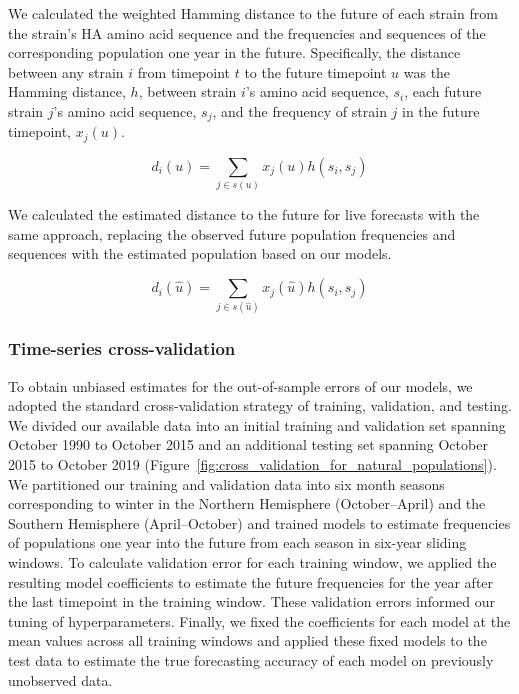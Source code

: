 We calculated the weighted Hamming distance to the future of each strain from the strain's HA amino acid sequence and the frequencies and sequences of the corresponding population one year in the future.
Specifically, the distance between any strain $i$ from timepoint $t$ to the future timepoint $u$ was the Hamming distance, $h$, between strain $i$'s amino acid sequence, $s_{i}$, each future strain $j$'s amino acid sequence, $s_{j}$, and the frequency of strain $j$ in the future timepoint, $x_{j}(u)$.

\begin{equation}
  d_{i}(u) = \sum_{j \in s(u)}{x_{j}(u)h(s_{i}, s_{j})}
  \label{equation_observed_weighted_distance_to_future}
\end{equation}

We calculated the estimated distance to the future for live forecasts with the same approach, replacing the observed future population frequencies and sequences with the estimated population based on our models.

\begin{equation}
  d_{i}(\hat{u}) = \sum_{j \in s(\hat{u})}{x_{j}(\hat{u})h(s_{i}, s_{j})}
  \label{equation_estimated_weighted_distance_to_future}
\end{equation}

\subsubsection*{Time-series cross-validation}

To obtain unbiased estimates for the out-of-sample errors of our models, we adopted the standard cross-validation strategy of training, validation, and testing.
We divided our available data into an initial training and validation set spanning October 1990 to October 2015 and an additional testing set spanning October 2015 to October 2019 (Figure~\ref{fig:cross_validation_for_natural_populations}).
We partitioned our training and validation data into six month seasons corresponding to winter in the Northern Hemisphere (October--April) and the Southern Hemisphere (April--October) and trained models to estimate frequencies of populations one year into the future from each season in six-year sliding windows.
To calculate validation error for each training window, we applied the resulting model coefficients to estimate the future frequencies for the year after the last timepoint in the training window.
These validation errors informed our tuning of hyperparameters.
Finally, we fixed the coefficients for each model at the mean values across all training windows and applied these fixed models to the test data to estimate the true forecasting accuracy of each model on previously unobserved data.

